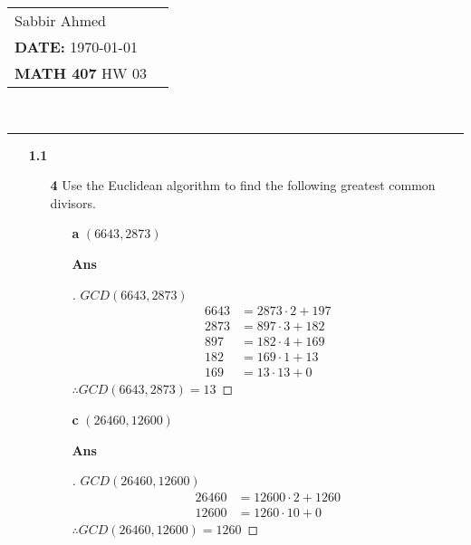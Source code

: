 \documentclass[paper=usletter, fontsize=12pt]{article}
\newcommand{\documentinfo}[5]{
    \begin{centering}
        \parbox{2in}{
        \begin{spacing}{1}
            \begin{flushleft}
                \begin{tabular}{l l}
                    #1 \\
                    #2 \\
                    #3 \\
                \end{tabular}\\
                \rule{\textwidth}{1pt}
            \end{flushleft}
        \end{spacing}
        }
    \end{centering}
}
\begin{document}
    \documentinfo{Sabbir Ahmed}{\textbf{DATE:} \today}{\textbf{MATH 407} HW 03}
    \vspace{-0.2in}

    \begin{itemize}

        \item[\textbf{1.1}]

            \begin{itemize}

                \item[\textbf{4}] Use the Euclidean algorithm to find the
                following greatest common divisors.

                \begin{itemize}

                    \item[\textbf{a}] $(6643, 2873)$
                    \item[\textbf{Ans}]
                    \begin{proof}[\unskip\nopunct]
                        $GCD(6643, 2873)$
                        \begin{align*}
                            6643 & = 2873 \cdot 2 + 197 \\
                            2873 & = 897 \cdot 3 + 182 \\
                            897 & = 182 \cdot 4 + 169 \\
                            182 & = 169 \cdot 1 + 13 \\
                            169 & = 13 \cdot 13 + 0
                        \end{align*}
                        $\therefore GCD(6643, 2873) = 13$ \qedhere
                    \end{proof}
                    \vspace{0.2in}

                    \item[\textbf{c}] $(26460, 12600)$
                    \item[\textbf{Ans}]
                    \begin{proof}[\unskip\nopunct]
                        $GCD(26460, 12600)$
                        \begin{align*}
                            26460 & = 12600 \cdot 2 + 1260 \\
                            12600 & = 1260 \cdot 10 + 0
                        \end{align*}
                        $\therefore GCD(26460, 12600) = 1260$ \qedhere
                    \end{proof}
                    \vspace{0.2in}


\end{itemize}
\end{itemize}
\end{itemize}
\end{document}
